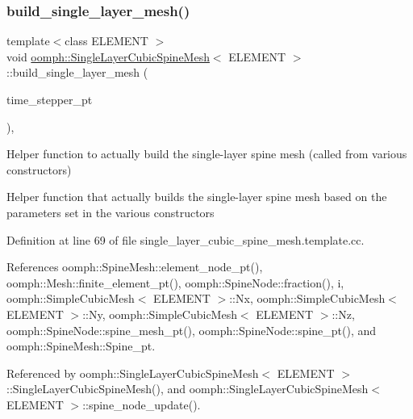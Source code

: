 \subsubsection{\texorpdfstring{build\+\_\+single\+\_\+layer\+\_\+mesh()}{build\_single\_layer\_mesh()}}
{\footnotesize\ttfamily template$<$class E\+L\+E\+M\+E\+NT $>$ \\
void \hyperlink{classoomph_1_1SingleLayerCubicSpineMesh}{oomph\+::\+Single\+Layer\+Cubic\+Spine\+Mesh}$<$ E\+L\+E\+M\+E\+NT $>$\+::build\+\_\+single\+\_\+layer\+\_\+mesh (\begin{DoxyParamCaption}\item[{\hyperlink{classoomph_1_1TimeStepper}{Time\+Stepper} $\ast$}]{time\+\_\+stepper\+\_\+pt }\end{DoxyParamCaption})\hspace{0.3cm}{\ttfamily [protected]}, {\ttfamily [virtual]}}



Helper function to actually build the single-\/layer spine mesh (called from various constructors) 

Helper function that actually builds the single-\/layer spine mesh based on the parameters set in the various constructors 

Definition at line 69 of file single\+\_\+layer\+\_\+cubic\+\_\+spine\+\_\+mesh.\+template.\+cc.



References oomph\+::\+Spine\+Mesh\+::element\+\_\+node\+\_\+pt(), oomph\+::\+Mesh\+::finite\+\_\+element\+\_\+pt(), oomph\+::\+Spine\+Node\+::fraction(), i, oomph\+::\+Simple\+Cubic\+Mesh$<$ E\+L\+E\+M\+E\+N\+T $>$\+::\+Nx, oomph\+::\+Simple\+Cubic\+Mesh$<$ E\+L\+E\+M\+E\+N\+T $>$\+::\+Ny, oomph\+::\+Simple\+Cubic\+Mesh$<$ E\+L\+E\+M\+E\+N\+T $>$\+::\+Nz, oomph\+::\+Spine\+Node\+::spine\+\_\+mesh\+\_\+pt(), oomph\+::\+Spine\+Node\+::spine\+\_\+pt(), and oomph\+::\+Spine\+Mesh\+::\+Spine\+\_\+pt.



Referenced by oomph\+::\+Single\+Layer\+Cubic\+Spine\+Mesh$<$ E\+L\+E\+M\+E\+N\+T $>$\+::\+Single\+Layer\+Cubic\+Spine\+Mesh(), and oomph\+::\+Single\+Layer\+Cubic\+Spine\+Mesh$<$ E\+L\+E\+M\+E\+N\+T $>$\+::spine\+\_\+node\+\_\+update().

\mbox{\label{classoomph_1_1SingleLayerCubicSpineMesh_a4851fbaed5be21441ad4f7b7f2a660e0}} 
